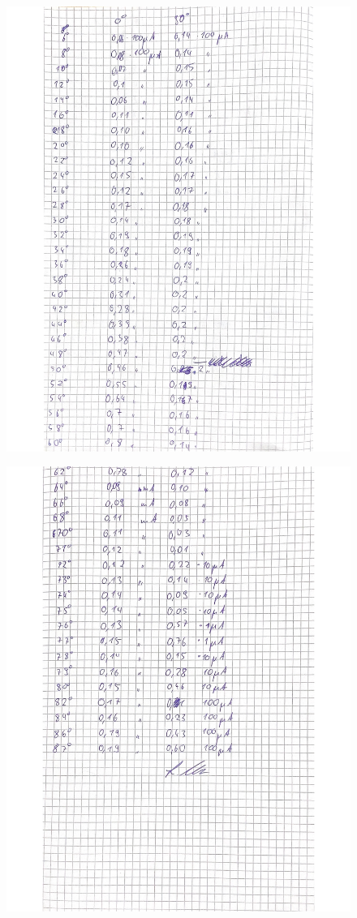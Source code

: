 \begin{figure}[H]
  \centering
  \includegraphics[width=\textwidth]{content/Bilder/3.Blatt.jpeg}
  \label{fig:Messungen_3}
\end{figure}
\begin{figure}[H]
    \centering
    \includegraphics[width=\textwidth]{content/Bilder/4.Blatt.jpeg}
    \label{fig:Messungen_4}
  \end{figure}